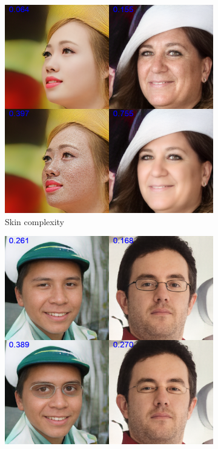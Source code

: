 \begin{figure}[H]
     \centering
     \begin{subfigure}[b]{0.49\textwidth}
     \centering
     \includegraphics[scale=0.16]{images/Pretrained_1.png}
     \caption{Skin complexity}
     \label{fig:Skin_pre}
     \end{subfigure}
     \hfill
     \begin{subfigure}[b]{0.49\textwidth}
     \centering
     \includegraphics[scale=0.16]{images/Pretrained_2.png}

\end{subfigure}
\end{figure}
